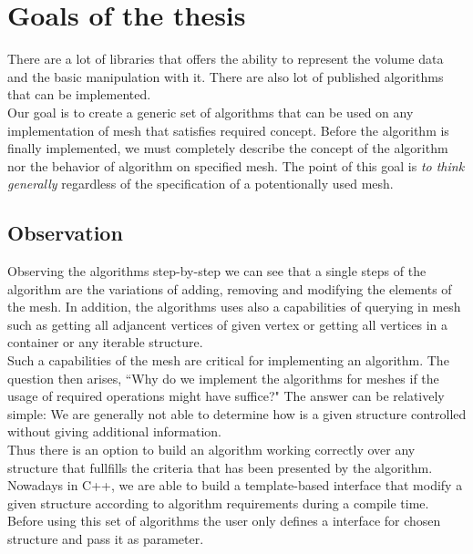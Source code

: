 \chapter{Goals of the thesis}

There are a lot of libraries that offers the ability to represent the volume data
and the basic manipulation with it. There are also lot of published algorithms
that can be implemented.\\

Our goal is to create a generic set of algorithms that can be used on any implementation
of mesh that satisfies required concept. Before the algorithm is finally implemented,
we must completely describe the concept of the algorithm nor the behavior of algorithm
on specified mesh. The point of this goal is \emph{to think generally} regardless of
the specification of a potentionally used mesh.\\

\section{Observation}

Observing the algorithms step-by-step we can see that a single steps
of the algorithm are the variations of adding, removing and modifying the elements
of the mesh. In addition, the algorithms uses also a capabilities of querying
in mesh such as getting all adjancent vertices of given vertex or getting all
vertices in a container or any iterable structure.\\

Such a capabilities of the mesh are critical for implementing an algorithm.
The question then arises, ``Why do we implement the algorithms for meshes if
the usage of required operations might have suffice?" The answer can be relatively simple:
We are generally not able to determine how is a given structure controlled
without giving additional information.\\

Thus there is an option to build an algorithm working correctly over any structure
that fullfills the criteria that has been presented by the algorithm. Nowadays in C++,
we are able to build a template-based interface that modify a given structure according
to algorithm requirements during a compile time.\\

Before using this set of algorithms the user only defines a interface for chosen structure
and pass it as parameter.

